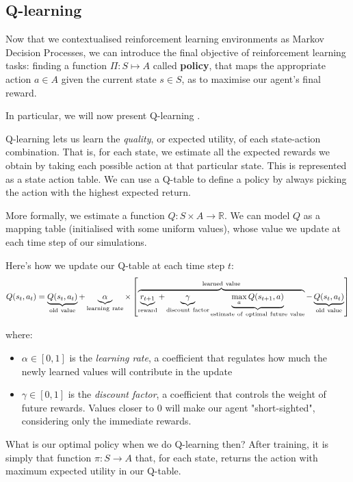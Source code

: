 \subsection{Q-learning}
\label{qlearning}
Now that we contextualised reinforcement learning environments as Markov Decision Processes, we can introduce the final objective of reinforcement learning tasks: finding a function $\Pi:S\mapsto A$ called \textbf{policy}, that maps the appropriate action $a\in A$ given the current state $s\in S$, as to maximise our agent's final reward.

In particular, we will now present Q-learning \parencite{watkins1992q}.

Q-learning lets us learn the \emph{quality}, or expected utility, of each state-action combination. That is, for each state, we estimate all the expected rewards we obtain by taking each possible action at that particular state. This is represented as a state action table. We can use a Q-table to define a policy by always picking the action with the highest expected return.

More formally, we estimate a function $Q: S \times A \to \mathbb{R}$. We can model $Q$ as a mapping table (initialised with some uniform values), whose value we update at each time step of our simulations.

Here's how we update our Q-table at each time step $t$:
\begin{equation} \label{eq:QlearningUpdate}
  Q(s_{t},a_{t}) = \underbrace{Q(s_t,a_t)}_{\rm old~value} +
  \underbrace{\alpha}_{\rm learning~rate} \times \left[
    \overbrace{\underbrace{r_{t+1}}_{\rm reward} + \underbrace{\gamma}_{\rm
        discount~factor} \underbrace{\max_{a}Q(s_{t+1}, a)}_{\rm
        estimate~of~optimal~future~value}}^{\rm learned~value} -
    \underbrace{Q(s_t,a_t)}_{\rm old~value} \right]
\end{equation}

where:
\begin{itemize}
	\item $\alpha\in[0,1]$ is the \emph{learning rate}, a coefficient that regulates how much the newly learned values will contribute in the update
	\item $\gamma\in[0,1]$ is the \emph{discount factor}, a coefficient that controls the weight of future rewards. Values closer to 0 will make our agent "short-sighted", considering only the immediate rewards.
\end{itemize}

What is our optimal policy when we do Q-learning then? After training, it is simply that function $\pi: S \to A$ that, for each state, returns the action with maximum expected utility in our Q-table.


